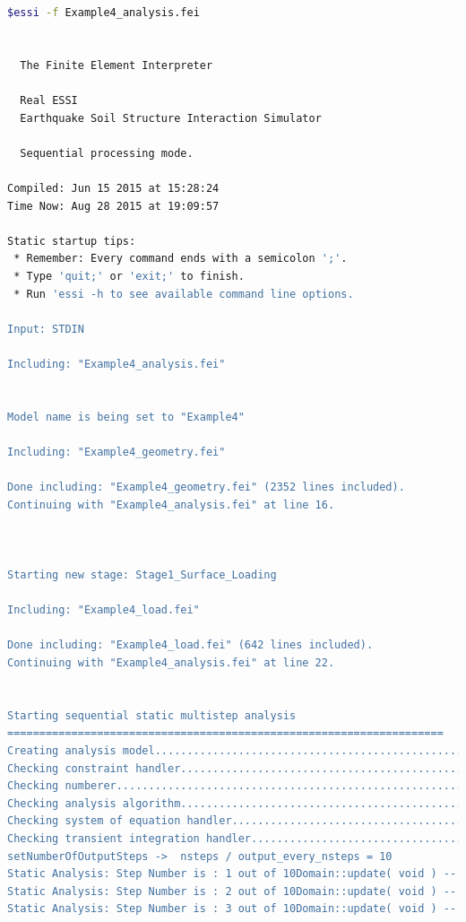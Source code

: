\documentclass[11pt]{article}
\begin{document}
\begin{lstlisting}[language=bash]
$essi -f Example4_analysis.fei
                                                              
                                                               
  The Finite Element Interpreter                               
                                                               
  Real ESSI                                                  
  Earthquake Soil Structure Interaction Simulator            
                                                             
  Sequential processing mode.                                
                                                             
Compiled: Jun 15 2015 at 15:28:24
Time Now: Aug 28 2015 at 19:09:57
                                                               
Static startup tips:                                           
 * Remember: Every command ends with a semicolon ';'.          
 * Type 'quit;' or 'exit;' to finish.                          
 * Run 'essi -h to see available command line options.        
                                                               
Input: STDIN

Including: "Example4_analysis.fei"


Model name is being set to "Example4"

Including: "Example4_geometry.fei"

Done including: "Example4_geometry.fei" (2352 lines included).
Continuing with "Example4_analysis.fei" at line 16.



Starting new stage: Stage1_Surface_Loading

Including: "Example4_load.fei"

Done including: "Example4_load.fei" (642 lines included).
Continuing with "Example4_analysis.fei" at line 22.


Starting sequential static multistep analysis
====================================================================
Creating analysis model...................................................Pass!
Checking constraint handler...............................................Pass!
Checking numberer.........................................................Pass!
Checking analysis algorithm...............................................Pass!
Checking system of equation handler.......................................Pass!
Checking transient integration handler....................................Pass!
setNumberOfOutputSteps ->  nsteps / output_every_nsteps = 10
Static Analysis: Step Number is : 1 out of 10Domain::update( void ) -- Constitutive integration happening!
Static Analysis: Step Number is : 2 out of 10Domain::update( void ) -- Constitutive integration happening!
Static Analysis: Step Number is : 3 out of 10Domain::update( void ) -- Constitutive integration happening!

\end{lstlisting}
\end{document}
